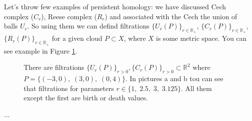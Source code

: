 \documentclass[a4paper, 12pt]{article}
\begin{document}
\par Let's throw few examples of persistent homology: we have discussed Cech complex ($C_r$), Reese complex ($R_r$) and associated with the Cech the union of balls $U_r$. So using them we can defind filtrations $\{U_r(P)\}_{r\in\mathbb{R}_+}$, $\{C_r(P)\}_{r\in\mathbb{R}_+}$, $\{R_r(P)\}_{r\in\mathbb{R}_+}$ for a given cloud $P\subset X$, where $X$ is some metric space. You can see example in Figure \ref{image2}.
\begin{figure}[h!]
\begin{minipage}[h]{1.10\linewidth}
\end{minipage}
\begin{minipage}[h]{1.10\linewidth}
\end{minipage}
\caption{There are filtrations $\{U_r(P)\}_{r>0}, \{C_r(P)\}_{r>0} \subset{\mathbb{R}^2}$ where $P=\{(-3, 0), \; (3, 0), \; (0, 4)\}$. In pictures a and b tou can see that filtrations for parameters $r\in\{1,\; 2.5,\; 3,\; 3.125\}$. All them except the first are birth or death values.}
\label{image2}
\end{figure}
\par ...%
\end{document}
